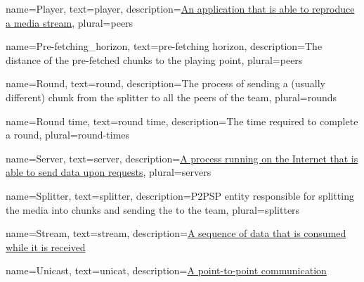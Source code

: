  {
    name={Player},
    text={player},
    description={\href{https://en.wikipedia.org/wiki/Media_player_software}{An application that is able to reproduce a media stream}},
    plural={peers}
}

 {
    name={Pre-fetching_horizon},
    text={pre-fetching horizon},
    description={The distance of the pre-fetched chunks to the playing point},
    plural={peers}
}

 {
    name={Round},
    text={round},
    description={The process of sending a (usually different) chunk from the splitter to all the peers of the team},
    plural={rounds}
}

 {
    name={Round time},
    text={round time},
    description={The time required to complete a round},
    plural={round-times}
}

 {
    name={Server},
    text={server},
    description={\href{https://en.wikipedia.org/wiki/Server_(computing)}{A process running on the Internet that is able to send data upon requests}},
    plural={servers}
}

 {
    name={Splitter},
    text={splitter},
    description={P2PSP entity responsible for splitting the \gls{media} into chunks and sending the to the team},
    plural={splitters}
}

 {
    name={Stream},
    text={stream},
    description={\href{https://en.wikipedia.org/wiki/Streaming_media}{A sequence of data that is consumed while it is received}}
}



 {
    name={Unicast},
    text={unicat},
    description={\href{https://en.wikipedia.org/wiki/Unicast}{A point-to-point communication}}
}


